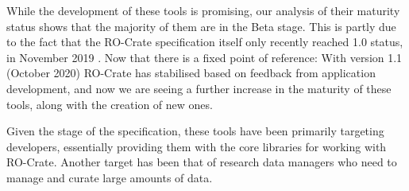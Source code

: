While the development of these tools is promising, our analysis of their
maturity status shows that the majority of them are in the Beta stage.
This is partly due to the fact that the RO-Crate specification itself
only recently reached 1.0 status, in November 2019
\cite{RO-Crate 1.0}. Now that there
is a fixed point of reference: With version 1.1 (October 2020)
\cite{RO-Crate 1.1} RO-Crate has
stabilised based on feedback from application development, and now we
are seeing a further increase in the maturity of these tools, along with
the creation of new ones.

Given the stage of the specification, these tools have been primarily
targeting developers, essentially providing them with the core libraries
for working with RO-Crate. Another target has been that of research data
managers who need to manage and curate large amounts of data.

